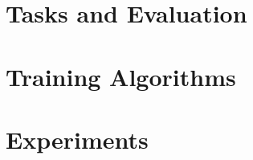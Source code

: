 \documentclass{article}
\begin{document}
\section{Tasks and Evaluation}

\section{Training Algorithms}

\section{Experiments}
\end{document}
